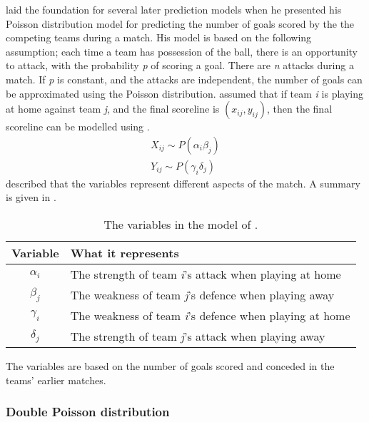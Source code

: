 \citet{bib:maher-1982} laid the foundation for several later prediction models when he presented his Poisson distribution model for predicting the number of goals scored by the the competing teams during a match. His model is based on the following assumption; each time a team has possession of the ball, there is an opportunity to attack, with the probability \textit{p} of scoring a goal. There are \textit{n} attacks during a match. If \textit{p} is constant, and the attacks are independent, the number of goals can be approximated using the Poisson distribution. \citet{bib:maher-1982} assumed that if team \textit{i} is playing at home against team \textit{j}, and the final scoreline is $(x_{ij}, y_{ij})$, then the final scoreline can be modelled using .
\begin{equation}
    \begin{aligned}
        X_{ij} \sim P(\alpha_{i}\beta_{j}) \\
        Y_{ij} \sim P(\gamma_{i}\delta_{j})
    \end{aligned}
    \label{eq:maher-model}
\end{equation}
\citet{bib:maher-1982} described that the variables represent different aspects of the match. A summary is given in .
\begin{table}[H]
    \centering
    \noindent\begin{tabulary}{\textwidth}{C | L}
        \textbf{Variable}   & \textbf{What it represents} \\\hline
        $\alpha_{i}$        & The strength of team \textit{i}'s attack when playing at home \\
        $\beta_{j}$          & The weakness of team \textit{j}'s defence when playing away \\
        $\gamma_{i}$        & The weakness of team \textit{i}'s defence when playing at home \\
        $\delta_{j}$        & The strength of team \textit{j}'s attack when playing away \\
    \end{tabulary}
    \caption{The variables in the model of \citet{bib:maher-1982}.}
    \label{tab:maher-model-description}
\end{table}
The variables are based on the number of goals scored and conceded in the teams' earlier matches.

\subsubsection{Double Poisson distribution}

